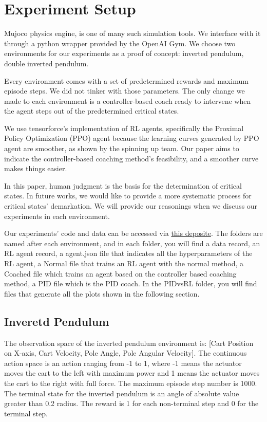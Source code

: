 \documentclass[smallextended]{svjour3}
\begin{document}
\section{Experiment Setup}
Mujoco physics engine\cite{6386109}, is one of many such simulation tools. We interface with it through a python wrapper provided by the OpenAI Gym\cite{Brockman2016OpenAIG}. We choose two environments for our experiments as a proof of concept: inverted pendulum, double inverted pendulum. 

Every environment comes with a set of predetermined rewards and maximum episode steps. We did not tinker with those parameters. The only change we made to each environment is a controller-based coach ready to intervene when the agent steps out of the predetermined critical states.

We use tensorforce's\cite{tensorforce} implementation of RL agents, specifically the Proximal Policy Optimization (PPO) agent because the learning curves generated by PPO agent are smoother, as shown by the spinning up\cite{SpinningUp2018} team. Our paper aims to indicate the controller-based coaching method's feasibility, and a smoother curve makes things easier. 

In this paper, human judgment is the basis for the determination of critical states. In future works, we would like to provide a more systematic process for critical states' demarkation. We will provide our reasonings when we discuss our experiments in each environment. 

Our experiments' code and data can be accessed via \href{https://github.com/BaiLiping/Coaching}{this deposite}. The folders are named after each environment, and in each folder, you will find a data record, an RL agent record, a agent.json file that indicates all the hyperparameters of the RL agent, a Normal file that trains an RL agent with the normal method, a Coached file which trains an agent based on the controller based coaching method, a PID file which is the PID coach. In the PIDvsRL folder, you will find files that generate all the plots shown in the following section.
\subsection{Inveretd Pendulum}
The observation space of the inverted pendulum environment is: [Cart Position on X-axis, Cart Velocity, Pole Angle, Pole Angular Velocity]. The continuous action space is an action ranging from -1 to 1, where -1 means the actuator moves the cart to the left with maximum power and 1 means the actuator moves the cart to the right with full force. The maximum episode step number is 1000. The terminal state for the inverted pendulum is an angle of absolute value greater than 0.2 radius. The reward is 1 for each non-terminal step and 0 for the terminal step. 
\end{document}
